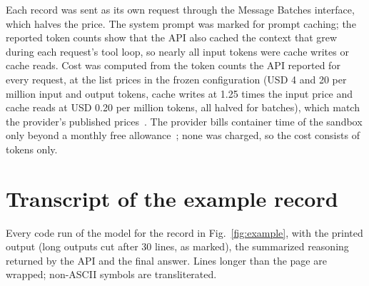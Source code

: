 Each record was sent as its own request through the Message Batches interface, which halves the price. The system
prompt was marked for prompt caching; the reported token counts show that the API also cached the context that grew
during each request's tool loop, so nearly all input tokens were cache writes or cache reads. Cost was computed from
the token counts the API reported for every request, at the list prices in the frozen configuration (USD 4 and 20 per
million input and output tokens, cache writes at 1.25 times the input price and cache reads at USD 0.20 per million
tokens, all halved for batches), which match the provider's published prices~\citep{anthropic2026pricing}. The
provider bills container time of the sandbox only beyond a monthly free allowance~\citep{anthropic2026pricing}; none
was charged, so the cost consists of tokens only.

\section{Transcript of the example record}\label{app:transcript}
Every code run of the model for the record in Fig.~\ref{fig:example}, with the printed output (long outputs cut after
30 lines, as marked), the summarized reasoning returned by the API and the final answer. Lines longer than the page
are wrapped; non-ASCII symbols are transliterated.

